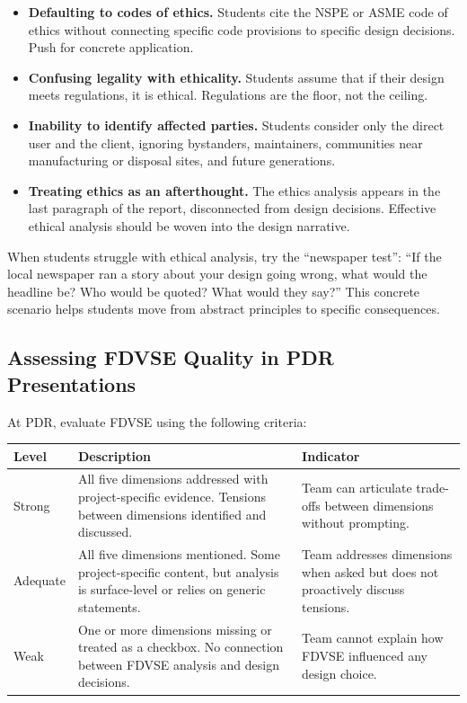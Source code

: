 \begin{itemize}[nosep,leftmargin=1.5em]
\item \textbf{Defaulting to codes of ethics.} Students cite the NSPE or ASME code of ethics without connecting specific code provisions to specific design decisions. Push for concrete application.

\item \textbf{Confusing legality with ethicality.} Students assume that if their design meets regulations, it is ethical. Regulations are the floor, not the ceiling.

\item \textbf{Inability to identify affected parties.} Students consider only the direct user and the client, ignoring bystanders, maintainers, communities near manufacturing or disposal sites, and future generations.

\item \textbf{Treating ethics as an afterthought.} The ethics analysis appears in the last paragraph of the report, disconnected from design decisions. Effective ethical analysis should be woven into the design narrative.
\end{itemize}

\begin{bestpractice}
When students struggle with ethical analysis, try the ``newspaper test'': ``If the local newspaper ran a story about your design going wrong, what would the headline be? Who would be quoted? What would they say?'' This concrete scenario helps students move from abstract principles to specific consequences.
\end{bestpractice}

\subsection{Assessing FDVSE Quality in PDR Presentations}

At PDR, evaluate FDVSE using the following criteria:

{\centering\small
\begin{tabularx}{\textwidth}{lXX}
\toprule
\textbf{Level} & \textbf{Description} & \textbf{Indicator} \\
\midrule
Strong & All five dimensions addressed with project-specific evidence. Tensions between dimensions identified and discussed. & Team can articulate trade-offs between dimensions without prompting. \\
\addlinespace
Adequate & All five dimensions mentioned. Some project-specific content, but analysis is surface-level or relies on generic statements. & Team addresses dimensions when asked but does not proactively discuss tensions. \\
\addlinespace
Weak & One or more dimensions missing or treated as a checkbox. No connection between FDVSE analysis and design decisions. & Team cannot explain how FDVSE influenced any design choice. \\
\bottomrule
\end{tabularx}
\par}


